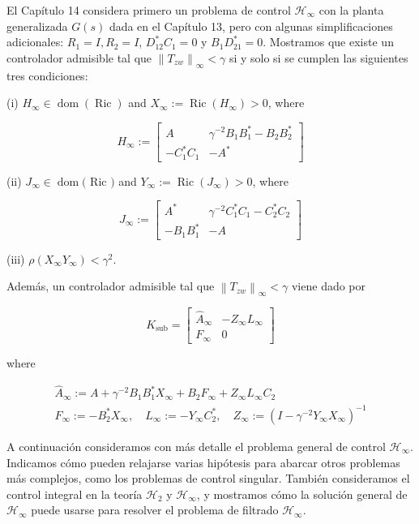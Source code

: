 El Capítulo 14 considera primero un problema de control $\mathcal{H}_{\infty}$ con la planta generalizada $G(s)$ dada en el Capítulo 13, pero con algunas simplificaciones adicionales: $R_{1}=I, R_{2}=I$, $D_{12}^{*} C_{1}=0$ y $B_{1} D_{21}^{*}=0$. Mostramos que existe un controlador admisible tal que $\left\|T_{z w}\right\|_{\infty}<\gamma$ si y solo si se cumplen las siguientes tres condiciones:

(i) $H_{\infty} \in \operatorname{dom}(\operatorname{Ric})$ and $X_{\infty}:=\operatorname{Ric}\left(H_{\infty}\right)>0$, where

$$
H_{\infty}:=\left[\begin{array}{cc}
A & \gamma^{-2} B_{1} B_{1}^{*}-B_{2} B_{2}^{*} \\
-C_{1}^{*} C_{1} & -A^{*}
\end{array}\right]
$$

(ii) $J_{\infty} \in \operatorname{dom}($ Ric $)$ and $Y_{\infty}:=\operatorname{Ric}\left(J_{\infty}\right)>0$, where

$$
J_{\infty}:=\left[\begin{array}{cc}
A^{*} & \gamma^{-2} C_{1}^{*} C_{1}-C_{2}^{*} C_{2} \\
-B_{1} B_{1}^{*} & -A
\end{array}\right]
$$

(iii) $\rho\left(X_{\infty} Y_{\infty}\right)<\gamma^{2}$.

Además, un controlador admisible tal que $\left\|T_{z w}\right\|_{\infty}<\gamma$ viene dado por

$$
K_{\mathrm{sub}}=\left[\begin{array}{c|c}
\hat{A}_{\infty} & -Z_{\infty} L_{\infty} \\
\hline F_{\infty} & 0
\end{array}\right]
$$

where

$$
\begin{gathered}
\hat{A}_{\infty}:=A+\gamma^{-2} B_{1} B_{1}^{*} X_{\infty}+B_{2} F_{\infty}+Z_{\infty} L_{\infty} C_{2} \\
F_{\infty}:=-B_{2}^{*} X_{\infty}, \quad L_{\infty}:=-Y_{\infty} C_{2}^{*}, \quad Z_{\infty}:=\left(I-\gamma^{-2} Y_{\infty} X_{\infty}\right)^{-1}
\end{gathered}
$$

A continuación consideramos con más detalle el problema general de control $\mathcal{H}_{\infty}$. Indicamos cómo pueden relajarse varias hipótesis para abarcar otros problemas más complejos, como los problemas de control singular. También consideramos el control integral en la teoría $\mathcal{H}_{2}$ y $\mathcal{H}_{\infty}$, y mostramos cómo la solución general de $\mathcal{H}_{\infty}$ puede usarse para resolver el problema de filtrado $\mathcal{H}_{\infty}$.


